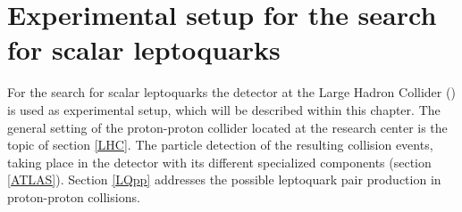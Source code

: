 \chapter{Experimental setup for the search for scalar leptoquarks}\label{experiment}
For the search for scalar leptoquarks the {\ATLAS} detector at the Large Hadron Collider ({\LHC}) is used as experimental setup, which will be described within this chapter. The general setting of the proton-proton collider located at the {\CERN} research center is the topic of section \ref{LHC}. The particle detection of the resulting collision events, taking place in the {\ATLAS} detector with its different specialized components (section \ref{ATLAS}). Section \ref{LQpp} addresses the possible leptoquark pair production in proton-proton collisions.  
